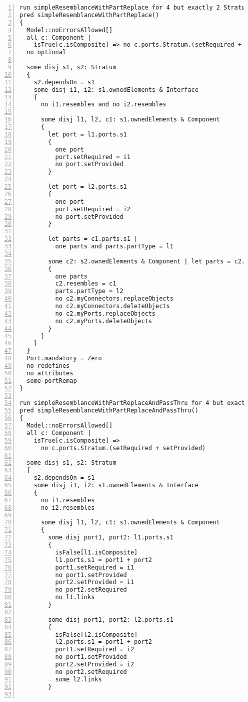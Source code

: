 \begin{lstlisting}[caption={unittests\_redefinition.als}, numbers=left]
run simpleResemblanceWithPartReplace for 4 but exactly 2 Stratum, 4 Component, exactly 2 Interface
pred simpleResemblanceWithPartReplace()
{
  Model::noErrorsAllowed[]
  all c: Component |
    isTrue[c.isComposite] => no c.ports.Stratum.(setRequired + setProvided)
  no optional
  
  some disj s1, s2: Stratum
  {
    s2.dependsOn = s1
    some disj i1, i2: s1.ownedElements & Interface
    {
      no i1.resembles and no i2.resembles
      
      some disj l1, l2, c1: s1.ownedElements & Component
      {
        let port = l1.ports.s1
        {
          one port
          port.setRequired = i1
          no port.setProvided
        }

        let port = l2.ports.s1
        {
          one port
          port.setRequired = i2
          no port.setProvided
        }
        
        let parts = c1.parts.s1 |
          one parts and parts.partType = l1

        some c2: s2.ownedElements & Component | let parts = c2.parts.s2
        {
          one parts
          c2.resembles = c1
          parts.partType = l2
          no c2.myConnectors.replaceObjects
          no c2.myConnectors.deleteObjects
          no c2.myPorts.replaceObjects
          no c2.myPorts.deleteObjects
        }
      }      
    }
  }
  Port.mandatory = Zero
  no redefines
  no attributes
  some portRemap
}

run simpleResemblanceWithPartReplaceAndPassThru for 4 but exactly 2 Stratum, 4 Component, exactly 2 Interface, 6 Port, 6 PortID, 4 ConnectorEnd, 8 LinkEnd
pred simpleResemblanceWithPartReplaceAndPassThru()
{
  Model::noErrorsAllowed[]
  all c: Component |
    isTrue[c.isComposite] =>
      no c.ports.Stratum.(setRequired + setProvided)
  
  some disj s1, s2: Stratum
  {
    s2.dependsOn = s1
    some disj i1, i2: s1.ownedElements & Interface
    {
      no i1.resembles
      no i2.resembles
      
      some disj l1, l2, c1: s1.ownedElements & Component
      {
        some disj port1, port2: l1.ports.s1
        {
          isFalse[l1.isComposite]
          l1.ports.s1 = port1 + port2
          port1.setRequired = i1
          no port1.setProvided
          port2.setProvided = i1
          no port2.setRequired
          no l1.links
        }

        some disj port1, port2: l2.ports.s1
        {
          isFalse[l2.isComposite]
          l2.ports.s1 = port1 + port2
          port1.setRequired = i2
          no port1.setProvided
          port2.setProvided = i2
          no port2.setRequired
          some l2.links
        }
        

\end{lstlisting}
